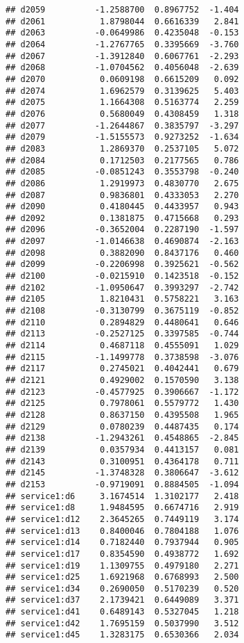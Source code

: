 \documentclass[
]{article}
\begin{document}
\begin{verbatim}
## d2059          -1.2588700  0.8967752  -1.404
## d2061           1.8798044  0.6616339   2.841
## d2063          -0.0649986  0.4235048  -0.153
## d2064          -1.2767765  0.3395669  -3.760
## d2067          -1.3912840  0.6067761  -2.293
## d2068          -1.0704562  0.4056048  -2.639
## d2070           0.0609198  0.6615209   0.092
## d2074           1.6962579  0.3139625   5.403
## d2075           1.1664308  0.5163774   2.259
## d2076           0.5680049  0.4308459   1.318
## d2077          -1.2644867  0.3835797  -3.297
## d2079          -1.5155573  0.9273252  -1.634
## d2083           1.2869370  0.2537105   5.072
## d2084           0.1712503  0.2177565   0.786
## d2085          -0.0851243  0.3553798  -0.240
## d2086           1.2919973  0.4830770   2.675
## d2087           0.9836801  0.4333053   2.270
## d2090           0.4180445  0.4433957   0.943
## d2092           0.1381875  0.4715668   0.293
## d2096          -0.3652004  0.2287190  -1.597
## d2097          -1.0146638  0.4690874  -2.163
## d2098           0.3882090  0.8437176   0.460
## d2099          -0.2206998  0.3925621  -0.562
## d2100          -0.0215910  0.1423518  -0.152
## d2102          -1.0950647  0.3993297  -2.742
## d2105           1.8210431  0.5758221   3.163
## d2108          -0.3130799  0.3675119  -0.852
## d2110           0.2894829  0.4480641   0.646
## d2113          -0.2527125  0.3397585  -0.744
## d2114           0.4687118  0.4555091   1.029
## d2115          -1.1499778  0.3738598  -3.076
## d2117           0.2745021  0.4042441   0.679
## d2121           0.4929002  0.1570590   3.138
## d2123          -0.4577925  0.3906667  -1.172
## d2125           0.7978061  0.5579772   1.430
## d2128           0.8637150  0.4395508   1.965
## d2129           0.0780239  0.4487435   0.174
## d2138          -1.2943261  0.4548865  -2.845
## d2139           0.0357934  0.4413157   0.081
## d2143           0.3100951  0.4364178   0.711
## d2145          -1.3748328  0.3806647  -3.612
## d2153          -0.9719091  0.8884505  -1.094
## service1:d6     3.1674514  1.3102177   2.418
## service1:d8     1.9484595  0.6674716   2.919
## service1:d12    2.3645265  0.7449119   3.174
## service1:d13    0.8400046  0.7804188   1.076
## service1:d14    0.7182440  0.7937944   0.905
## service1:d17    0.8354590  0.4938772   1.692
## service1:d19    1.1309755  0.4979180   2.271
## service1:d25    1.6921968  0.6768993   2.500
## service1:d34    0.2690050  0.5170239   0.520
## service1:d37    2.1739421  0.6449089   3.371
## service1:d41    0.6489143  0.5327045   1.218
## service1:d42    1.7695159  0.5037990   3.512
## service1:d45    1.3283175  0.6530366   2.034

\end{verbatim}
\end{document}
